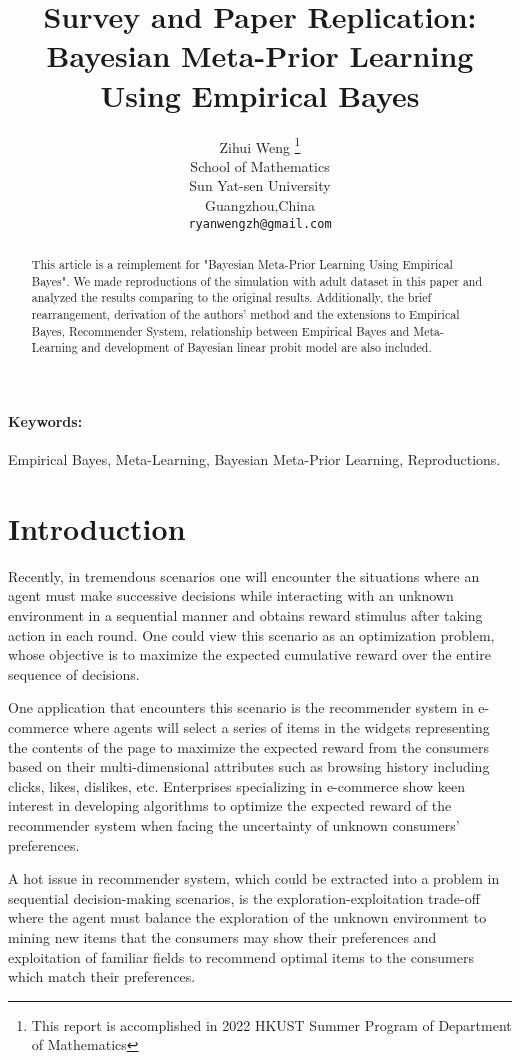 \documentclass{article}
\title{Survey and Paper Replication: Bayesian Meta-Prior Learning Using Empirical Bayes}
\author{%
  Zihui Weng \thanks{This report is accomplished in 2022 HKUST Summer Program of Department of Mathematics} \\
  School of Mathematics\\
  Sun Yat-sen University\\
  Guangzhou,China \\
  \texttt{ryanwengzh@gmail.com} \\
}
\begin{document}
\maketitle


\begin{abstract}
  This article is a reimplement for "Bayesian Meta-Prior Learning Using Empirical Bayes". We made reproductions of the simulation with adult dataset in this paper and analyzed the results comparing to the original results. Additionally, the brief rearrangement, derivation of the authors' method and the extensions to Empirical Bayes, Recommender System, relationship between Empirical Bayes and Meta-Learning and development of Bayesian linear probit model are also included.
\end{abstract}

\paragraph*{Keywords:} Empirical Bayes, Meta-Learning, Bayesian Meta-Prior Learning, Reproductions.


\section{Introduction}
Recently, in tremendous scenarios one will encounter the situations where an agent must make successive decisions while interacting with an unknown environment in a sequential manner and obtains reward stimulus after taking action in each round. One could view this scenario as an optimization problem, whose objective is to maximize the expected cumulative reward over the entire sequence of decisions. 

One application that encounters this scenario is the recommender system in e-commerce where agents will select a series of items in the widgets representing the contents of the page to maximize the expected reward from the consumers based on their multi-dimensional attributes such as browsing history including clicks, likes, dislikes, etc. Enterprises specializing in e-commerce show keen interest in developing algorithms to optimize the expected reward of the recommender system when facing the uncertainty of unknown consumers' preferences.

A hot issue in recommender system, which could be extracted into a problem in sequential decision-making scenarios, is the exploration-exploitation trade-off where the agent must balance the exploration of the unknown environment to mining new items that the consumers may show their preferences and exploitation of familiar fields to recommend optimal items to the consumers which match their preferences. 
\end{document}
